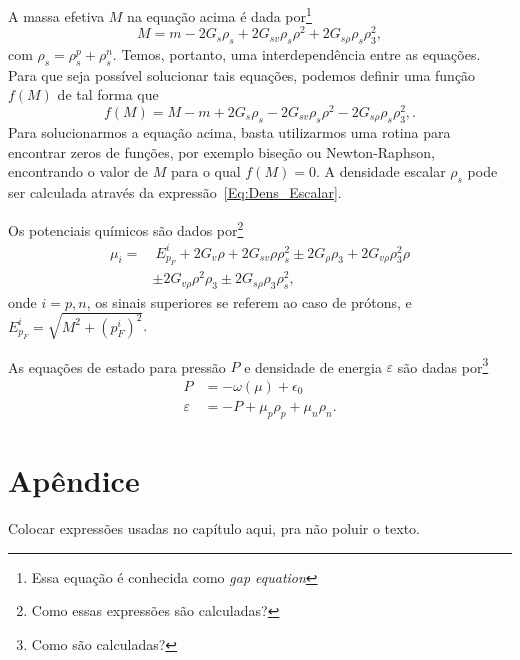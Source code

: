 A massa efetiva $M$ na equação acima é dada por\footnote{Essa equação é conhecida como \emph{gap equation}}
\begin{equation}\label{Eq:Gap}
	M = m - 2G_s\rho_s + 2G_{sv}\rho_s\rho^2 + 2 G_{s\rho}\rho_s\rho_3^2,
\end{equation}
%
com $\rho_s = \rho_s^p + \rho_s^n$. Temos, portanto, uma interdependência entre as equações. Para que seja possível solucionar tais equações, podemos definir uma função $f(M)$ de tal forma que
\begin{equation}\label{Eq:Gap_zero}
	f(M) = M - m + 2G_s\rho_s - 2G_{sv}\rho_s\rho^2 - 2 G_{s\rho}\rho_s\rho_3^2,.
\end{equation}
%
Para solucionarmos a equação acima, basta utilizarmos uma rotina para encontrar zeros de funções, por exemplo biseção ou Newton-Raphson, encontrando o valor de $M$ para o qual $f(M) = 0$. A densidade escalar $\rho_s$ pode ser calculada através da expressão~\eqref{Eq:Dens_Escalar}.

Os potenciais químicos são dados por\footnote{Como essas expressões são calculadas?}
\begin{equation}\label{Eq:Potenciais_Quimicos}
\begin{split}
	\mu_i =&~ E_{p_F}^i + 2G_v\rho + 2G_{sv}\rho\rho_s^2 \pm 2G_\rho\rho_3+2G_{v\rho}\rho_3^2\rho \\
	& \pm 2G_{v\rho}\rho^2\rho_3 \pm 2 G_{s\rho}\rho_3\rho_s^2,
\end{split}
\end{equation}
%
onde $i = p,n$, os sinais superiores se referem ao caso de prótons, e $E_{p_F}^i = \sqrt{M^2 + (p_F^i)^2}$.

As equações de estado para pressão $P$ e densidade de energia $\varepsilon$ são dadas por\footnote{Como são calculadas?}
\begin{align}
	P &= -\omega(\mu) + \epsilon_0 \label{Eq:Pressao}\\
	\varepsilon &= -P + \mu_p\rho_p + \mu_n\rho_n. \label{Eq:Densidade_energia}
\end{align}

\section{Apêndice}

Colocar expressões usadas no capítulo aqui, pra não poluir o texto.

